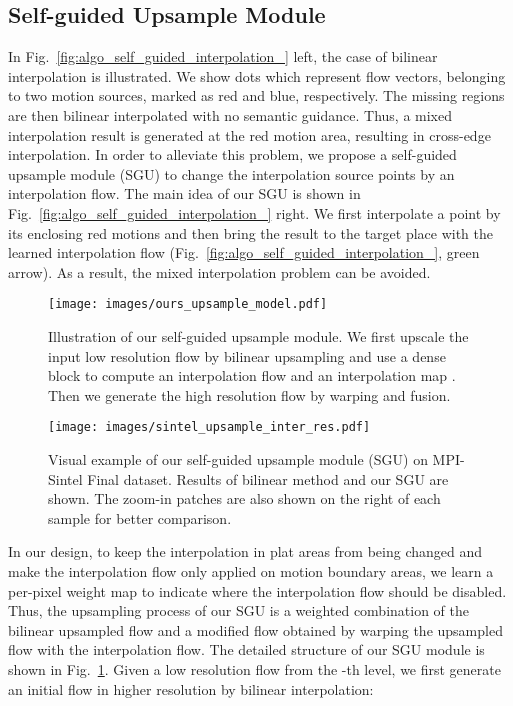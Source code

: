 \documentclass[final]{cvpr}
\begin{document}
\subsection{Self-guided Upsample Module}\label{sec:algo_self_guided_upsample}
In Fig.~\ref{fig:algo_self_guided_interpolation_} left, the case of bilinear interpolation is illustrated. We show  dots which represent  flow vectors, belonging to two motion sources, marked as red and blue, respectively. The missing regions are then bilinear interpolated with no semantic guidance. Thus, a mixed interpolation result is generated at the red motion area, resulting in cross-edge interpolation. In order to alleviate this problem, we propose a self-guided upsample module (SGU) to change the interpolation source points by an interpolation flow.
The main idea of our SGU is shown in Fig.~\ref{fig:algo_self_guided_interpolation_} right. We first interpolate a point by its enclosing red motions and then bring the result to the target place with the learned interpolation flow (Fig.~\ref{fig:algo_self_guided_interpolation_}, green arrow). As a result, the mixed interpolation problem can be avoided. 

\begin{figure}
	\centering
	\texttt{[image: images/ours\_upsample\_model.pdf]}
	\caption{Illustration of our self-guided upsample module. We first upscale the input low resolution flow  by bilinear upsampling and use a dense block to compute an interpolation flow  and an interpolation map . Then we generate the high resolution flow by warping and fusion. 
	}\label{fig:algo_our_upsample_model}
\end{figure}

\begin{figure*}
	\centering
	\texttt{[image: images/sintel\_upsample\_inter\_res.pdf]}
	\caption{Visual example of our self-guided upsample module (SGU) on MPI-Sintel Final dataset. Results of bilinear method and our SGU are shown. The zoom-in patches are also shown on the right of each sample for better comparison. 
}\label{fig:upsample_inter_res_sintel}
\end{figure*}

In our design, to keep the interpolation in plat areas from being changed and make the interpolation flow only applied on motion boundary areas, we learn a per-pixel weight map to indicate where the interpolation flow should be disabled. Thus, the upsampling process of our SGU is a weighted combination of the bilinear upsampled flow and a modified flow obtained by warping the upsampled flow with the interpolation flow. 
The detailed structure of our SGU module is shown in Fig.~\ref{fig:algo_our_upsample_model}. 
Given a low resolution flow  from the -th level, we first generate an initial flow  in higher resolution by bilinear interpolation:
\end{document}
